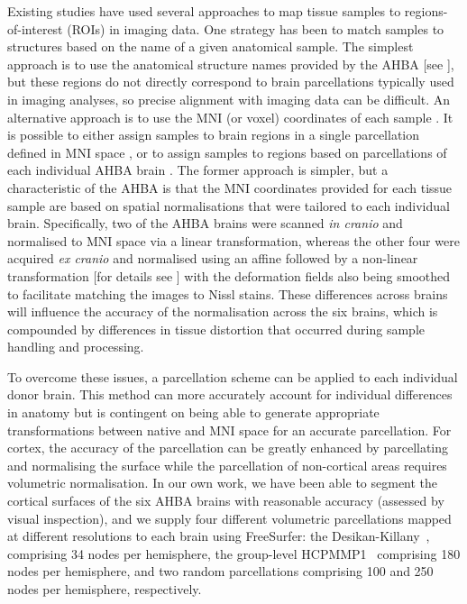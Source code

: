 Existing studies have used several approaches to map tissue samples to regions-of-interest (ROIs) in imaging data.
One strategy has been to match samples to structures based on the name of a given anatomical sample. The simplest approach is to use the anatomical structure names provided by the AHBA [see \citet{AHBAdoc,Tan2013,Myers2015a,Chen2016,Kirsch2016a,Hecker2017,Lee2017a,Negi2017}], but these regions do not directly correspond to brain parcellations typically used in imaging analyses, so precise alignment with imaging data can be difficult. An alternative approach is to use the MNI (or voxel) coordinates of each sample \citep{Goyal2014,Cioli2014b,French2015,Richiardi2015,Komorowski2016,Krienen2016,Rizzo2016,Burt2018,Parkes2017,Romme2017,Shin2017,Anderson2018,Romero-Garcia2018}.
It is possible to either assign samples to brain regions in a single parcellation defined in MNI space \mbox{\citep{Krienen2016,Keo2017,Parkes2017,Romme2017}}, or to assign samples to regions based on parcellations of each individual AHBA brain \mbox{\citep{Romero-Garcia2018}}. The former approach is simpler, but a characteristic of the AHBA is that the MNI coordinates provided for each tissue sample are based on spatial normalisations that were tailored to each individual brain. Specifically, two of the AHBA brains were scanned \textit{in cranio} and normalised to MNI space via a linear transformation, whereas the other four were acquired \textit{ex cranio} and normalised using an affine followed by a non-linear transformation [for details see \mbox{\citep{AHBAdoc}}] with the deformation fields also being smoothed to facilitate matching the images to Nissl stains. These differences across brains will influence the accuracy of the normalisation across the six brains, which is compounded by differences in tissue distortion that occurred during sample handling and processing.

To overcome these issues, a parcellation scheme can be applied to each individual donor brain. This method can more accurately account for individual differences in anatomy but is contingent on being able to generate appropriate transformations between native and MNI space for an accurate parcellation. For cortex, the accuracy of the parcellation can be greatly enhanced by parcellating and normalising the surface while the parcellation of non-cortical areas requires volumetric normalisation. In our own work, we have been able to segment the cortical surfaces of the six AHBA brains with reasonable accuracy (assessed by visual inspection), and we supply four different volumetric parcellations mapped at different resolutions to each brain using FreeSurfer: the \mbox{Desikan-Killany \citep{Desikan2006}}, comprising 34 nodes per hemisphere, the group-level \mbox{HCPMMP1 \citep{Glasser2016}} comprising 180 nodes per hemisphere, and two random parcellations comprising 100 and 250 nodes per hemisphere, respectively.

